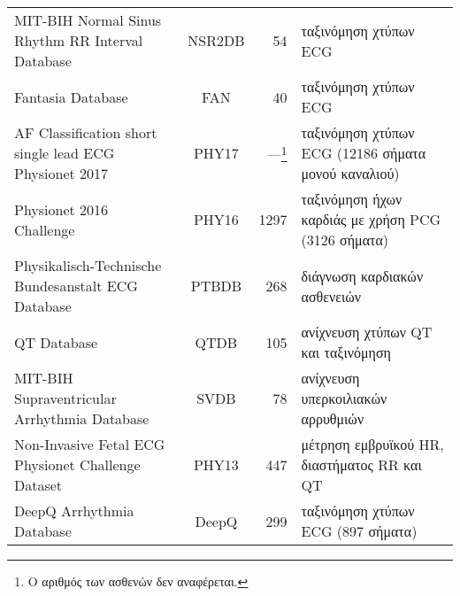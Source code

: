 \begin{sidewaystable}
\begin{tabular}{l c r l}
		MIT-BIH Normal Sinus Rhythm RR Interval Database~\cite{goldsmith1992comparison}                                                      & NSR2DB            & 54                                                                             & ταξινόμηση χτύπων ECG                                                 \\
		Fantasia Database~\cite{iyengar1996age}                                                                                              & FAN               & 40                                                                             & ταξινόμηση χτύπων ECG                                                 \\
		AF Classification short single lead ECG Physionet 2017~\cite{moody2001impact}                                                        & PHY17             & ---\footnote{Ο αριθμός των ασθενών δεν αναφέρεται.} & ταξινόμηση χτύπων ECG (12186 σήματα μονού καναλιού)                   \\
		Physionet 2016 Challenge~\cite{liu2016open}                                                                                          & PHY16             & 1297                                                                           & ταξινόμηση ήχων καρδιάς με χρήση PCG (3126 σήματα)                    \\
		Physikalisch-Technische Bundesanstalt ECG Database~\cite{bousseljot1995nutzung}                                                      & PTBDB             & 268                                                                            & διάγνωση καρδιακών ασθενειών                                          \\
		QT Database~\cite{laguna1997database}                                                                                                & QTDB              & 105                                                                            & ανίχνευση χτύπων QT και ταξινόμηση                                    \\
		MIT-BIH Supraventricular Arrhythmia Database~\cite{greenwald1990improved}                                                            & SVDB              & 78                                                                             & ανίχνευση υπερκοιλιακών αρρυθμιών                                     \\
		Non-Invasive Fetal ECG Physionet Challenge Dataset~\cite{silva2013noninvasive}                                                       & PHY13             & 447                                                                            & μέτρηση εμβρυϊκού HR, διαστήματος RR και QT                           \\
		DeepQ Arrhythmia Database~\cite{wu2017deepq} & DeepQ             & 299                                                                            & ταξινόμηση χτύπων ECG (897 σήματα)                                    \\
		\bottomrule
	\end{tabular}
\end{sidewaystable}

